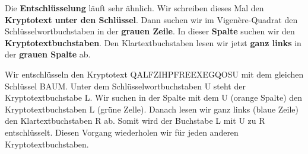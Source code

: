 \begin{table}[H]
\centering
{}
\end{table}

Die \textbf{Entschlüsselung} läuft sehr ähnlich. Wir schreiben dieses Mal den \textbf{Kryptotext unter den Schlüssel}. Dann suchen wir im Vigenère-Quadrat den Schlüsselwortbuchstaben in der \textbf{grauen Zeile}. In dieser \textbf{Spalte} suchen wir den \textbf{Kryptotextbuchstaben}. Den Klartextbuchstaben lesen wir jetzt \textbf{ganz links} in der \textbf{grauen Spalte} ab.

\begin{example}
Wir entschlüsseln den Kryptotext QALFZIHPFREEXEGQOSU mit dem gleichen Schlüssel BAUM. Unter dem Schlüsselwortbuchstaben U steht der Kryptotextbuchstabe L. Wir suchen in der Spalte mit dem U (orange Spalte) den Kryptotextbuchstaben L (grüne Zelle). Danach lesen wir ganz links (blaue Zeile) den Klartextbuchstaben R ab. Somit wird der Buchstabe L mit U zu R entschlüsselt. Diesen Vorgang wiederholen wir für jeden anderen Kryptotextbuchstaben.
\end{example}

\begin{table}[H]
\centering
{}
\end{table}

